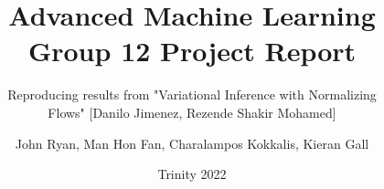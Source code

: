 \documentclass[12pt]{ociamthesis}
\title{Advanced Machine Learning \\
        Group 12 Project Report}
\subtitle{Reproducing results from "Variational Inference with Normalizing \\[1ex] Flows" [Danilo Jimenez, Rezende Shakir Mohamed]}
\author{John Ryan, Man Hon Fan, Charalampos Kokkalis, Kieran Gall}
\date{Trinity 2022}
\begin{document}
\setcounter{tocdepth}{3}


\maketitle

\begin{romanpages}
\tableofcontents
\end{romanpages}


          





\renewcommand{\bibname}{References}

\end{document}
